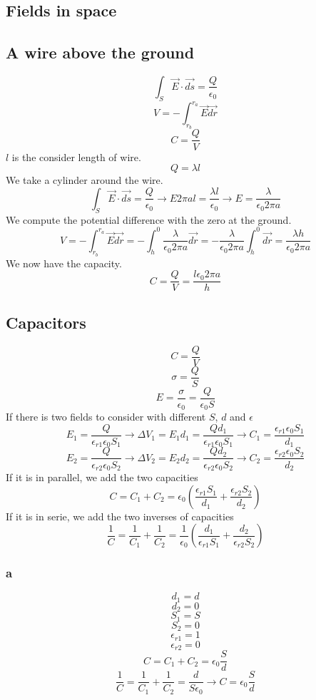 \subsection{Fields in space}

\subsection{A wire above the ground}
\[
	\int_S \vec{E} \cdot \vec{ds} = \frac{Q}{\epsilon_0}
\]
\[
	V = - \int_{r_b}^{r_a} \vec{E} \vec{dr}
\]
\[
	C = \frac{Q}{V}
\]
\(l\) is the consider length of wire.
\[
	Q = \lambda l
\]
We take a cylinder around the wire.
\[
	\int_S \vec{E} \cdot \vec{ds} = \frac{Q}{\epsilon_0}
	\to E 2 \pi a l = \frac{\lambda l}{\epsilon_0}
	\to E = \frac{\lambda}{\epsilon_0 2 \pi a}
\]
We compute the potential difference with the zero at the ground.
\[
	V = - \int_{r_b}^{r_a} \vec{E} \vec{dr}
	= - \int_{h}^{0} \frac{\lambda}{\epsilon_0 2 \pi a} \vec{dr}
	= - \frac{\lambda}{\epsilon_0 2 \pi a} \int_{h}^{0} \vec{dr}
	= \frac{\lambda h}{\epsilon_0 2 \pi a}
\]
We now have the capacity.
\[
	C = \frac{Q}{V}
	= \frac{l \epsilon_0 2 \pi a}{h}
\]

\subsection{Capacitors}

\[
	C = \frac{Q}{V}
\]
\[
	\sigma = \frac{Q}{S}
\]
\[
	E = \frac{\sigma}{\epsilon_0} = \frac{Q}{\epsilon_0 S}
\]
If there is two fields to consider with different \(S\), \(d\) and \(\epsilon\)
\[
	E_1 = \frac{Q}{\epsilon_{r1} \epsilon_0 S_1}
	\to \Delta V_1 = E_1 d_1 = \frac{Q d_1}{\epsilon_{r1} \epsilon_0 S_1}
	\to C_1 = \frac{\epsilon_{r1} \epsilon_0 S_1}{d_1}
\]
\[
	E_2 = \frac{Q}{\epsilon_{r2} \epsilon_0 S_2}
	\to \Delta V_2 = E_2 d_2 = \frac{Q d_2}{\epsilon_{r2} \epsilon_0 S_2}
	\to C_2 = \frac{\epsilon_{r2} \epsilon_0 S_2}{d_2}
\]
If it is in parallel, we add the two capacities
\[
	C = C_1 + C_2 = \epsilon_0
	( \frac{\epsilon_{r1} S_1}{d_1} + \frac{\epsilon_{r2} S_2}{d_2} )
\]
If it is in serie, we add the two inverses of capacities
\[
	\frac{1}{C} = \frac{1}{C_1} + \frac{1}{C_2}
	= \frac{1}{\epsilon_0}
	( \frac{d_1}{\epsilon_{r1} S_1} +
	\frac{d_2}{\epsilon_{r2} S_2} )
\]

\subsubsection{a}
\[
	d_1 = d
\]
\[
	d_2 = 0
\]
\[
	S_1 = S
\]
\[
	S_2 = 0
\]
\[
	\epsilon_{r1} = 1
\]
\[
	\epsilon_{r2} = 0
\]
\[
	C = C_1 + C_2 = \epsilon_0 \frac{S}{d}
\]
\[
	\frac{1}{C} = \frac{1}{C_1} + \frac{1}{C_2}
	= \frac{d}{S \epsilon_0}
	\to C = \epsilon_0 \frac{S}{d}
\]

